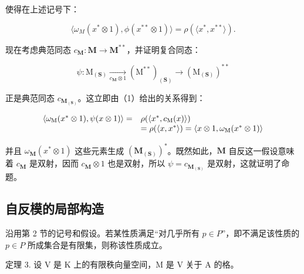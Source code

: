 使得在上述记号下：

\[
\langle \omega_ {M} (x ^ {*} \otimes 1), \phi (x ^ {* *} \otimes 1) \rangle = \rho (\langle x ^ {*}, x ^ {* *} \rangle).\tag{1}
\]

现在考虑典范同态 \(c_{\mathbf{M}}: \mathbf{M} \to \mathbf{M}^{**}\)，并证明复合同态：

\[
\psi : \mathrm{M} _ {(\mathbf {S})} \xrightarrow [ c _ {\mathbf {M}} \otimes 1 ]{} (\mathrm{M} ^ {* *}) _ {(\mathbf {S})} \longrightarrow (\mathrm{M} _ {(\mathbf {S})}) ^ {* *}\tag{2}
\]

正是典范同态 \(c_{\mathbf{M}_{(\mathbf{S})}}\)。这立即由（1）给出的关系得到：

\[
\begin{array}{r l} \langle \omega_ {\mathrm{M}} (x ^ {*} \otimes 1), \psi (x \otimes 1) \rangle = & \rho (\langle x ^ {*}, c _ {\mathrm{M}} (x) \rangle) \\ & = \rho (\langle x, x ^ {*} \rangle) = \langle x \otimes 1, \omega_ {\mathrm{M}} (x ^ {*} \otimes 1) \rangle \end{array}
\]

并且 \(\omega_{\mathbf{M}}(x^{*}\otimes 1)\) 这些元素生成 \((\mathbf{M}_{(\mathbf{S})})^{*}\)。既然如此，\(\mathbf{M}\) 自反这一假设意味着 \(c_{\mathbf{M}}\) 是双射，因而 \(c_{\mathbf{M}}\otimes 1\) 也是双射，所以 \(\psi = c_{\mathbf{M}_{(\mathbf{S})}}\) 是双射，这就证明了命题。

\subsection{自反模的局部构造}

沿用第 2 节的记号和假设。若某性质满足``对几乎所有 \(p \in P\)''，即不满足该性质的 \(p \in P\) 所成集合是有限集，则称该性质成立。

定理 3. 设 V 是 K 上的有限秩向量空间，M 是 V 关于 A 的格。

